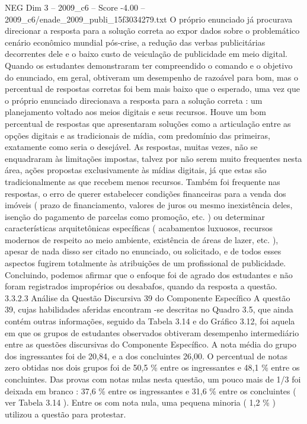 \begin{textsample}{NEG Dim 3 – 2009\_c6 – Score -4.00 – 2009\_c6/enade\_2009\_publi\_15f3034279.txt}
O próprio enunciado já procurava direcionar a resposta para a solução correta ao expor dados sobre o problemático cenário econômico mundial pós-crise, a redução das verbas publicitárias decorrentes dele e o baixo custo de veiculação de publicidade em meio digital.
Quando os estudantes demonstraram ter compreendido o comando e o objetivo do enunciado, em geral, obtiveram um desempenho de razoável para bom, mas o percentual de respostas corretas foi bem mais baixo que o esperado, uma vez que o próprio enunciado direcionava a resposta para a solução correta : um planejamento voltado aos meios digitais e seus recursos.
Houve um bom percentual de respostas que apresentaram soluções como a articulação entre as opções digitais e as tradicionais de mídia, com predomínio das primeiras, exatamente como seria o desejável.
As respostas, muitas vezes, não se enquadraram às limitações impostas, talvez por não serem muito frequentes nesta área, ações propostas exclusivamente às mídias digitais, já que estas são tradicionalmente as que recebem menos recursos.
Também foi frequente nas respostas, o erro de querer estabelecer condições financeiras para a venda dos imóveis ( prazo de financiamento, valores de juros ou mesmo inexistência deles, isenção do pagamento de parcelas como promoção, etc. ) ou determinar características arquitetônicas específicas ( acabamentos luxuosos, recursos modernos de respeito ao meio ambiente, existência de áreas de lazer, etc. ), apesar de nada disso ser citado no enunciado, ou solicitado, e de todos esses aspectos fugirem totalmente às atribuições de um profissional de publicidade.
Concluindo, podemos afirmar que o enfoque foi de agrado dos estudantes e não foram registrados impropérios ou desabafos, quando da resposta a questão. 3.3.2.3 Análise da Questão Discursiva 39 do Componente Específico A questão 39, cujas habilidades aferidas encontram -se descritas no Quadro 3.5, que ainda contém outras informações, seguido da Tabela 3.14 e do Gráfico 3.12, foi aquela em que os grupos de estudantes observados obtiveram desempenho intermediário entre as questões discursivas do Componente Específico.
A nota média do grupo dos ingressantes foi de 20,84, e a dos concluintes 26,00.
O percentual de notas zero obtidas nos dois grupos foi de 50,5 \% entre os ingressantes e 48,1 \% entre os concluintes.
Das provas com notas nulas nesta questão, um pouco mais de 1/3 foi deixada em branco : 37,6 \% entre os ingressantes e 31,6 \% entre os concluintes ( ver Tabela 3.14 ).
Entre os com nota nula, uma pequena minoria ( 1,2 \% ) utilizou a questão para protestar.

\end{textsample}
